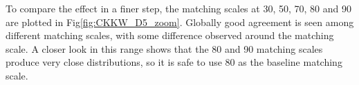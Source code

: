 To compare the effect in a finer step, the matching scales at 30, 50, 70, 80 and 90 \gev are plotted in Fig\ref{fig:CKKW_D5_zoom}. Globally good agreement is seen among different matching scales, with some difference observed around the matching scale. A closer look in this range shows that the 80 and 90 \gev matching scales produce very close distributions, so it is safe to use 80 \gev as the baseline matching scale.

\begin{figure}[h!]
	\centering  
	\hfill
\end{figure}
